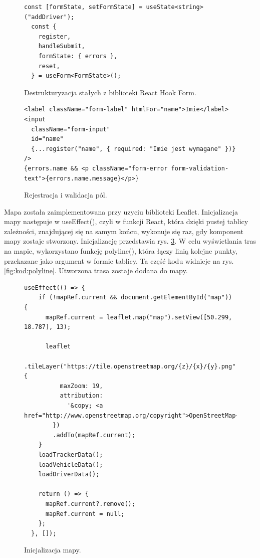 \begin{figure}
\centering
\begin{lstlisting}
const [formState, setFormState] = useState<string>("addDriver");
  const {
    register,
    handleSubmit,
    formState: { errors },
    reset,
  } = useForm<FormState>();
\end{lstlisting}
\caption{Destrukturyzacja stałych z biblioteki React Hook Form.}
\label{fig:kod:consts}
\end{figure}

\begin{figure}
\centering
\begin{lstlisting}
<label className="form-label" htmlFor="name">Imie</label>
<input
  className="form-input"
  id="name"
  {...register("name", { required: "Imie jest wymagane" })}
/>
{errors.name && <p className="form-error form-validation-text">{errors.name.message}</p>}
\end{lstlisting}
\caption{Rejestracja i walidacja pól.}
\label{fig:kod:register}
\end{figure}

Mapa została zaimplementowana przy uzyciu biblioteki Leaflet. Inicjalizacja mapy następuje w useEffect(), czyli w funkcji React, która dzięki pustej tablicy zależności, znajdującej się na samym końcu, wykonuje się raz, gdy komponent mapy zostaje stworzony. Inicjalizację przedstawia rys. \ref{fig:kod:mapInit}. W celu wyświetlania tras na mapie, wykorzystano funkcję polyline(), która łączy linią kolejne punkty, przekazane jako argument w formie tablicy. Ta część kodu widnieje na rys. \ref{fig:kod:polyline}. Utworzona trasa zostaje dodana do mapy. 

\begin{figure}
\centering
\begin{lstlisting}
useEffect(() => {
    if (!mapRef.current && document.getElementById("map")) {
      mapRef.current = leaflet.map("map").setView([50.299, 18.787], 13);

      leaflet
        .tileLayer("https://tile.openstreetmap.org/{z}/{x}/{y}.png", {
          maxZoom: 19,
          attribution:
            '&copy; <a href="http://www.openstreetmap.org/copyright">OpenStreetMap</a>',
        })
        .addTo(mapRef.current);
    }
    loadTrackerData();
    loadVehicleData();
    loadDriverData();

    return () => {
      mapRef.current?.remove();
      mapRef.current = null;
    };
  }, []);
\end{lstlisting}
\caption{Inicjalizacja mapy.}
\label{fig:kod:mapInit}
\end{figure}

